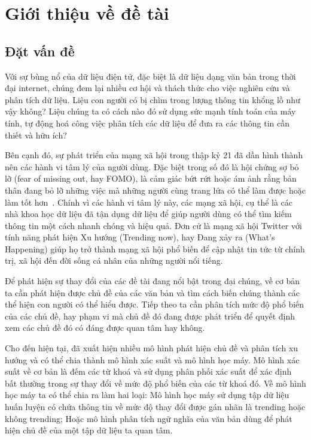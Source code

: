 \section{Giới thiệu về đề tài}
\label{sec:introduction}

\subsection{Đặt vấn đề}
Với sự bùng nổ của dữ liệu điện tử, đặc biệt là dữ liệu dạng văn bản trong thời
đại internet, chúng đem lại nhiều cơ hội và thách thức cho việc nghiên cứu và
phân tích dữ liệu. Liệu con người có bị chìm trong lượng thông tin khổng lồ như
vậy không? Liệu chúng ta có cách nào đó sử dụng sức mạnh tính toán của máy
tính, tự động hoá công việc phân tích các dữ liệu để đưa ra các thông tin cần
thiết và hữu ích?

Bên cạnh đó, sự phát triển của mạng xã hội trong thập kỷ 21 đã dần hình thành
nên các hành vi tâm lý của người dùng. Đặc biệt trong số đó là hội chứng sợ bỏ
lỡ (fear of missing out, hay FOMO), là cảm giác bứt rứt hoặc ám ảnh rằng bản
thân đang bỏ lỡ những việc mà những người cùng trang lứa có thể làm được hoặc
làm tốt hơn~\cite{jwtintelligenceFearMissingOut2015}. Chính vì các hành vi tâm
lý này, các mạng xã hội, cụ thể là các nhà khoa học dữ liệu đã tận dụng dữ liệu
để giúp người dùng có thể tìm kiếm thông tin một cách nhanh chóng và hiệu quả.
Đơn cử là mạng xã hội Twitter với tính năng phát hiện Xu hướng (Trending now),
hay Đang xảy ra (What's Happening) giúp họ trở thành mạng xã hội phổ biến để
cập nhật tin tức từ chính trị, xã hội đến đời sống cá nhân của những người nổi
tiếng.

Để phát hiện sự thay đổi của các đề tài đang nổi bật trong đại chúng, về cơ bản
ta cần phát hiện được chủ đề của các văn bản và tìm cách biến chúng thành các
thể hiện con người có thể hiểu được. Tiếp theo ta cần phân tích mức độ phổ biến
của các chủ đề, hay phạm vi mà chủ đề đó đang được phát triển để quyết định
xem các chủ đề đó có đáng được quan tâm hay không.

Cho đến hiện tại, đã xuất hiện nhiều mô hình phát hiện chủ đề và phân tích xu
hướng và có thể chia thành mô hình xác suất và mô hình học máy. Mô hình xác
suất về cơ bản là đếm các từ khoá và sử dụng phân phối xác suất để xác định bất
thường trong sự thay đổi về mức độ phổ biến của các từ khoá đó. Về mô hình học
máy ta có thể chia ra làm hai loại: Mô hình học máy sử dụng tập dữ liệu huấn
luyện có chứa thông tin về mức độ thay đổi được gán nhãn là trending hoặc không
trending; Hoặc mô hình phân tích ngữ nghĩa của văn bản dùng để phát hiện chủ đề
của một tập dữ liệu ta quan tâm.

